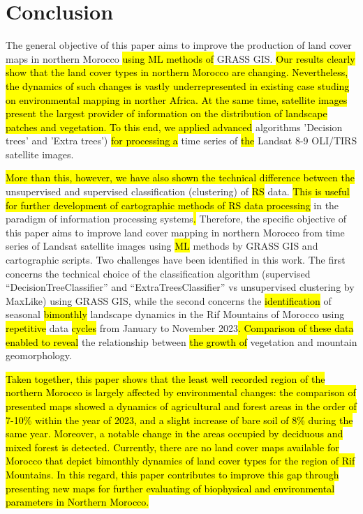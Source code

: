 \documentclass[geomatics,article,submit,pdftex,moreauthors]{Definitions/mdpi}
\begin{document}
\section{Conclusion}

The general objective of this paper aims to improve the production of land cover maps in northern Morocco \hl{using ML methods of }GRASS GIS. \hl{Our results clearly show that the land cover types in northern Morocco are changing. Nevertheless, the dynamics of such changes is vastly underrepresented in existing case studing on environmental mapping in norther Africa. At the same time, satellite images present the largest provider of information on the distribution of landscape patches and vegetation. To this end, we applied advanced }algorithms 'Decision trees' and 'Extra trees') \hl{for processing a} time series of \hl{the }Landsat 8-9 OLI/TIRS satellite images. 

\hl{More than this, however, we have also shown the technical difference between the} unsupervised and supervised classification (clustering) of \hl{RS} data. \hl{This is useful for further development of cartographic methods of RS data processing} in the paradigm of information processing systems\hl{. }Therefore, the specific objective of this paper aims to improve land cover mapping in northern Morocco from time series of Landsat satellite images using \hl{ML} methods by GRASS GIS and cartographic scripts. Two challenges have been identified in this work. The first concerns the technical choice of the classification algorithm (supervised “DecisionTreeClassifier” and “ExtraTreesClassifier” vs unsupervised clustering by MaxLike) using GRASS GIS, while the second concerns the \hl{identification} of seasonal \hl{bimonthly} landscape dynamics in the Rif Mountains of Morocco using\hl{ repetitive }data \hl{cycles} from January to November 2023\hl{. Comparison of these data enabled to reveal }the relationship between \hl{the growth of }vegetation and mountain geomorphology.

\hl{Taken together, this paper shows that the least well recorded region of the northern Morocco is largely affected by environmental changes: the comparison of presented maps showed a dynamics of agricultural and forest areas in the order of 7-10\% within the year of 2023, and a slight increase of bare soil of 8\% during the same year. Moreover, a notable change in the areas occupied by deciduous and mixed forest is detected. Currently, there are no land cover maps available for Morocco that depict bimonthly dynamics of land cover types for the region of Rif Mountains. In this regard, this paper contributes to improve this gap through presenting new maps for further evaluating of biophysical and environmental parameters in Northern Morocco. }
\end{document}
